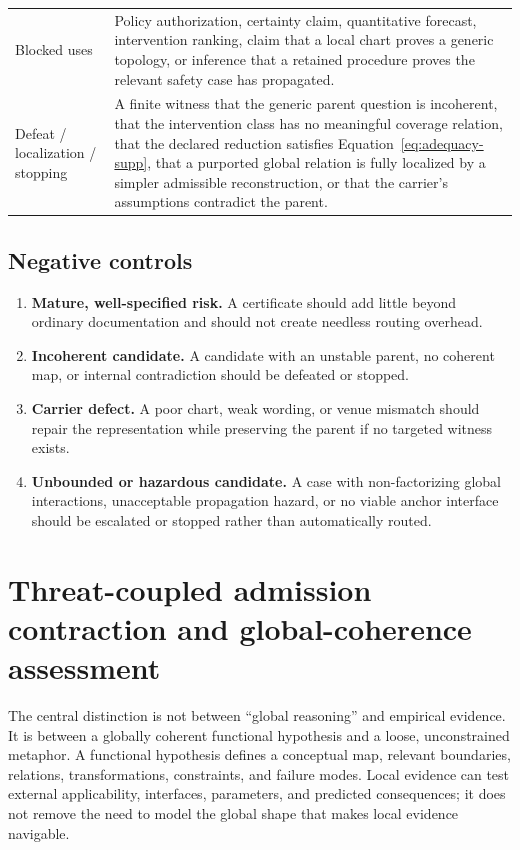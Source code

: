 \documentclass[10pt]{article}
\begin{document}
\begin{longtable}{@{}p{}p{}@{}}
Blocked uses & Policy authorization, certainty claim, quantitative forecast, intervention ranking, claim that a local chart proves a generic topology, or inference that a retained procedure proves the relevant safety case has propagated. \\
Defeat / localization / stopping & A finite witness that the generic parent question is incoherent, that the intervention class has no meaningful coverage relation, that the declared reduction satisfies Equation~\eqref{eq:adequacy-supp}, that a purported global relation is fully localized by a simpler admissible reconstruction, or that the carrier's assumptions contradict the parent. \\
\end{longtable}

\subsection{Negative controls}

\begin{enumerate}[label=(\arabic*)]
\item \textbf{Mature, well-specified risk.} A certificate should add little beyond ordinary documentation and should not create needless routing overhead.
\item \textbf{Incoherent candidate.} A candidate with an unstable parent, no coherent map, or internal contradiction should be defeated or stopped.
\item \textbf{Carrier defect.} A poor chart, weak wording, or venue mismatch should repair the representation while preserving the parent if no targeted witness exists.
\item \textbf{Unbounded or hazardous candidate.} A case with non-factorizing global interactions, unacceptable propagation hazard, or no viable anchor interface should be escalated or stopped rather than automatically routed.
\end{enumerate}

\section{Threat-coupled admission contraction and global-coherence assessment}
\label{sec:global}

The central distinction is not between ``global reasoning'' and empirical evidence. It is between a globally coherent functional hypothesis and a loose, unconstrained metaphor. A functional hypothesis defines a conceptual map, relevant boundaries, relations, transformations, constraints, and failure modes. Local evidence can test external applicability, interfaces, parameters, and predicted consequences; it does not remove the need to model the global shape that makes local evidence navigable.
\end{document}
